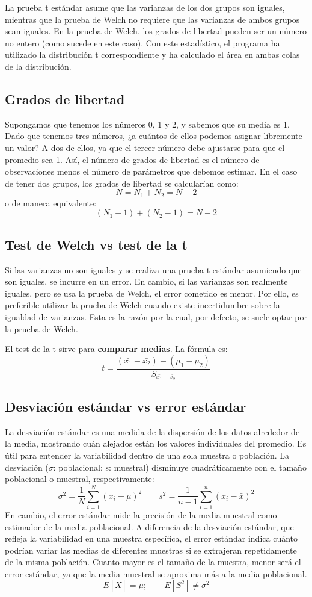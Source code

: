 \documentclass{config/apuntes}\usepackage[]{graphicx}\usepackage[]{xcolor}
\begin{document}
La prueba t estándar asume que las varianzas de los dos grupos son iguales, mientras que la prueba de Welch no requiere que las varianzas de ambos grupos sean iguales. En la prueba de Welch, los grados de libertad pueden ser un número no entero (como sucede en este caso). Con este estadístico, el programa ha utilizado la distribución t correspondiente y ha calculado el área en ambas colas de la distribución.

\subsection{Grados de libertad}
Supongamos que tenemos los números 0, 1 y 2, y sabemos que su media es 1. Dado que tenemos tres números, ¿a cuántos de ellos podemos asignar libremente un valor? A dos de ellos, ya que el tercer número debe ajustarse para que el promedio sea 1. Así, el número de grados de libertad es el número de observaciones menos el número de parámetros que debemos estimar. En el caso de tener dos grupos, los grados de libertad se calcularían como:
$$ N = N_1 + N_2 = N - 2$$
o de manera equivalente:
$$(N_1 - 1) + (N_2 - 1) = N - 2$$

\subsection{Test de Welch vs test de la t}
Si las varianzas no son iguales y se realiza una prueba t estándar asumiendo que son iguales, se incurre en un error. En cambio, si las varianzas son realmente iguales, pero se usa la prueba de Welch, el error cometido es menor. Por ello, es preferible utilizar la prueba de Welch cuando existe incertidumbre sobre la igualdad de varianzas. Esta es la razón por la cual, por defecto, se suele optar por la prueba de Welch.


El test de la t sirve para \textbf{comparar medias}. La fórmula es:
\[
t = \frac{(\bar{x_1} - \bar{x_2})-(\mu_1 - \mu_2)}{S_{\bar{x_1}-\bar{x_2}}}
\]

\subsection{Desviación estándar vs error estándar}
La desviación estándar es una medida de la dispersión de los datos alrededor de la media, mostrando cuán alejados están los valores individuales del promedio. Es útil para entender la variabilidad dentro de una sola muestra o población. La desviación ($\sigma$: poblacional; s: muestral) disminuye cuadráticamente con el tamaño poblacional o muestral, respectivamente:
\[
\sigma^2 = \frac{1}{N} \sum_{i=1}^{N} (x_i - \mu)^2 \quad \quad  s^2 = \frac{1}{n - 1} \sum_{i=1}^{n} (x_i - \bar{x})^2
\]
En cambio, el error estándar mide la precisión de la media muestral como estimador de la media poblacional. A diferencia de la desviación estándar, que refleja la variabilidad en una muestra específica, el error estándar indica cuánto podrían variar las medias de diferentes muestras si se extrajeran repetidamente de la misma población. Cuanto mayor es el tamaño de la muestra, menor será el error estándar, ya que la media muestral se aproxima más a la media poblacional.
$$ E[\bar{X}] = \mu ; \quad \quad E[S^2] \neq \sigma^2$$
\end{document}
